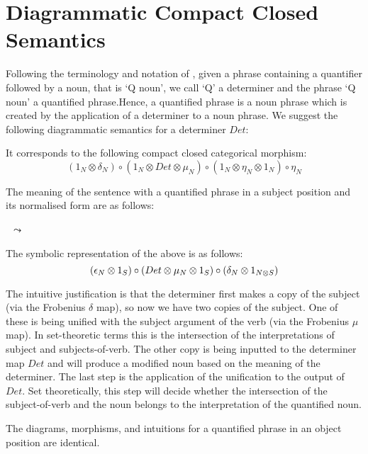 \section{Diagrammatic  Compact Closed Semantics}


Following the terminology and notation of \cite{BarwiseCooper81}, given a phrase containing a quantifier followed by a noun, that is `Q noun', we call `Q' a determiner and the phrase `Q noun' a quantified  phrase.Hence,  a quantified phrase is a noun phrase which is created by the application of a determiner to a noun phrase.   We suggest the following  diagrammatic semantics for  a determiner $Det$:

\begin{center}
\end{center}

\noindent
It corresponds to the following compact closed categorical morphism:
{
\[
(1_N \otimes \delta_N) \circ (1_N \otimes Det \otimes \mu_N) \circ (1_N \otimes \eta_N \otimes 1_N) \circ \eta_N 
\]}

\noindent
The meaning of the sentence with a quantified phrase in a subject position and its normalised form are as follows:


\begin{minipage}{20cm}
\begin{minipage}{7cm}
\end{minipage}
\ $\leadsto$ \
\begin{minipage}{5cm}
\end{minipage}
\end{minipage}


\noindent
The symbolic representation of the above is as follows:
\[{\small
(\epsilon_N \otimes 1_S) \circ (Det \otimes  \mu_N \otimes 1_S) \circ (\delta_N \otimes 1_{N \otimes S})}
\]


The intuitive justification  is that the determiner first makes a copy of the subject (via the Frobenius $\delta$ map), so now we have two copies of the subject. One of these is being unified with the subject argument of the verb (via the Frobenius $\mu$ map). In set-theoretic terms this is the intersection of the interpretations of subject and subjects-of-verb. The other copy is being inputted to the determiner map $Det$ and will produce a modified noun based on the meaning of the determiner.  The last step is the application of the unification to the output of $Det$. Set theoretically, this step will decide whether the intersection of the subject-of-verb and the noun belongs to the interpretation of the quantified noun. 

 
The diagrams,  morphisms, and intuitions for a quantified phrase in an object position are identical.

